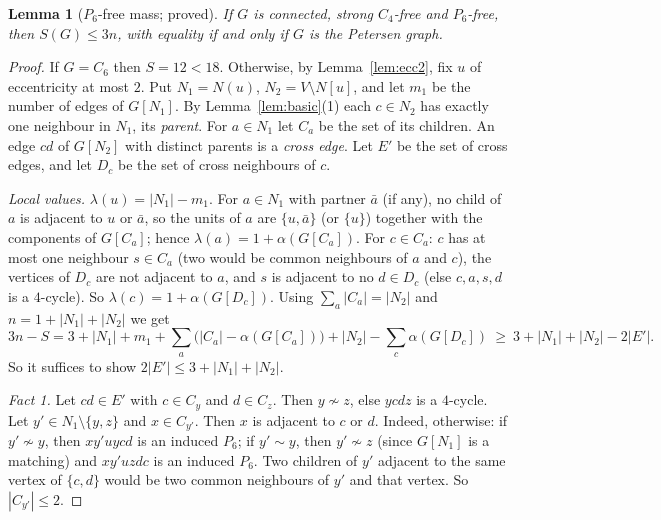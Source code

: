 \documentclass[11pt]{amsart}
\newtheorem{lemma}[theorem]{Lemma}
\theoremstyle{definition}
\theoremstyle{remark}
\begin{document}
\begin{lemma}[$P_6$-free mass; proved]\label{lem:p6}
If $G$ is connected, strong $C_4$-free and $P_6$-free, then $S(G)\le3n$, with equality if and only if $G$ is the Petersen graph.
\end{lemma}

\begin{proof}
If $G=C_6$ then $S=12<18$. Otherwise, by Lemma~\ref{lem:ecc2}, fix $u$ of eccentricity at most $2$. Put $N_1=N(u)$, $N_2=V\setminus N[u]$, and let $m_1$ be the number of edges of $G[N_1]$. By Lemma~\ref{lem:basic}(1) each $c\in N_2$ has exactly one neighbour in $N_1$, its \emph{parent}. For $a\in N_1$ let $C_a$ be the set of its children. An edge $cd$ of $G[N_2]$ with distinct parents is a \emph{cross edge}. Let $E'$ be the set of cross edges, and let $D_c$ be the set of cross neighbours of $c$.

\emph{Local values.} $\lambda(u)=|N_1|-m_1$. For $a\in N_1$ with partner $\bar a$ (if any), no child of $a$ is adjacent to $u$ or $\bar a$, so the units of $a$ are $\{u,\bar a\}$ (or $\{u\}$) together with the components of $G[C_a]$; hence $\lambda(a)=1+\alpha(G[C_a])$. For $c\in C_a$: $c$ has at most one neighbour $s\in C_a$ (two would be common neighbours of $a$ and $c$), the vertices of $D_c$ are not adjacent to $a$, and $s$ is adjacent to no $d\in D_c$ (else $c,a,s,d$ is a $4$-cycle). So $\lambda(c)=1+\alpha(G[D_c])$. Using $\sum_a|C_a|=|N_2|$ and $n=1+|N_1|+|N_2|$ we get
\begin{equation}\label{eq:p6id}
3n-S=3+|N_1|+m_1+\sum_a\bigl(|C_a|-\alpha(G[C_a])\bigr)+|N_2|-\sum_{c}\alpha(G[D_c])\ \ge\ 3+|N_1|+|N_2|-2|E'|.
\end{equation}
So it suffices to show $2|E'|\le3+|N_1|+|N_2|$.

\emph{Fact 1.} Let $cd\in E'$ with $c\in C_y$ and $d\in C_z$. Then $y\not\sim z$, else $ycdz$ is a $4$-cycle. Let $y'\in N_1\setminus\{y,z\}$ and $x\in C_{y'}$. Then $x$ is adjacent to $c$ or $d$. Indeed, otherwise: if $y'\not\sim y$, then $xy'uycd$ is an induced $P_6$; if $y'\sim y$, then $y'\not\sim z$ (since $G[N_1]$ is a matching) and $xy'uzdc$ is an induced $P_6$. Two children of $y'$ adjacent to the same vertex of $\{c,d\}$ would be two common neighbours of $y'$ and that vertex. So $|C_{y'}|\le2$.


\end{proof}
\end{document}
